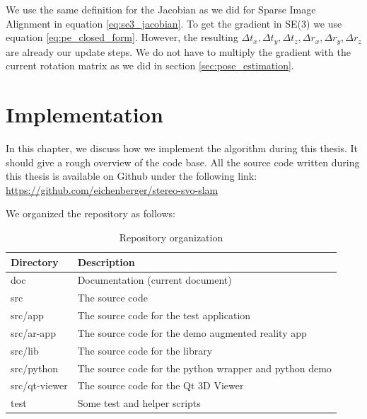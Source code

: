 \documentclass[11pt,a4paper,titlepage,oneside]{report}
\begin{document}
We use the same definition for the Jacobian as we did for Sparse Image Alignment in equation \ref{eq:se3_jacobian}. To get the gradient in SE(3) we use equation \ref{eq:pe_closed_form}. However, the resulting $\Delta t_x,\Delta t_y,\Delta t_z,\Delta r_x,\Delta r_y,\Delta r_z$ are already our update steps. We do not have to multiply the gradient with the current rotation matrix as we did in section \ref{sec:pose_estimation}.

\chapter{Implementation}\label{ch:implementation}
In this chapter, we discuss how we implement the algorithm during this thesis. It should give a rough overview of the code base. All the source code written during this thesis is available on Github under the following link:\\
\url{https://github.com/eichenberger/stereo-svo-slam}

We organized the repository as follows:
\begin{table}[H]
  \centering
  \begin{tabular}{|l|l|}
    Directory & Description\\
    \hline
    doc & Documentation (current document)\\
    src  & The source code\\
    src/app & The source code for the test application\\
    src/ar-app & The source code for the demo augmented reality app\\
    src/lib & The source code for the library\\
    src/python & The source code for the python wrapper and python demo\\
    src/qt-viewer & The source code for the Qt 3D Viewer\\
    test & Some test and helper scripts
  \end{tabular}
\caption{Repository organization}
\label{tab:organization}
\end{table}
\end{document}
